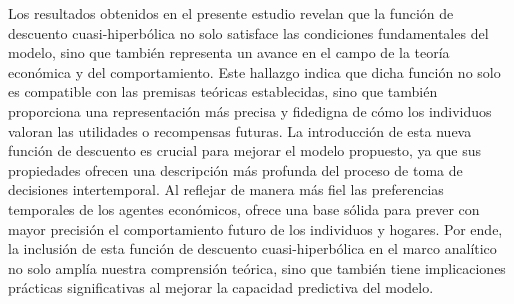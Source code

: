 Los resultados obtenidos en el presente estudio revelan que la función de descuento cuasi-hiperbólica no solo satisface las condiciones fundamentales del modelo, sino que también representa un avance en el campo de la teoría económica y del comportamiento. Este hallazgo indica que dicha función no solo es compatible con las premisas teóricas establecidas, sino que también proporciona una representación más precisa y fidedigna de cómo los individuos valoran las utilidades o recompensas futuras. La introducción de esta nueva función de descuento es crucial para mejorar el modelo propuesto, ya que sus propiedades ofrecen una descripción más profunda del proceso de toma de decisiones intertemporal. Al reflejar de manera más fiel las preferencias temporales de los agentes económicos, ofrece una base sólida para prever con mayor precisión el comportamiento futuro de los individuos y hogares. Por ende, la inclusión de esta función de descuento cuasi-hiperbólica en el marco analítico no solo amplía nuestra comprensión teórica, sino que también tiene implicaciones prácticas significativas al mejorar la capacidad predictiva del modelo.

 